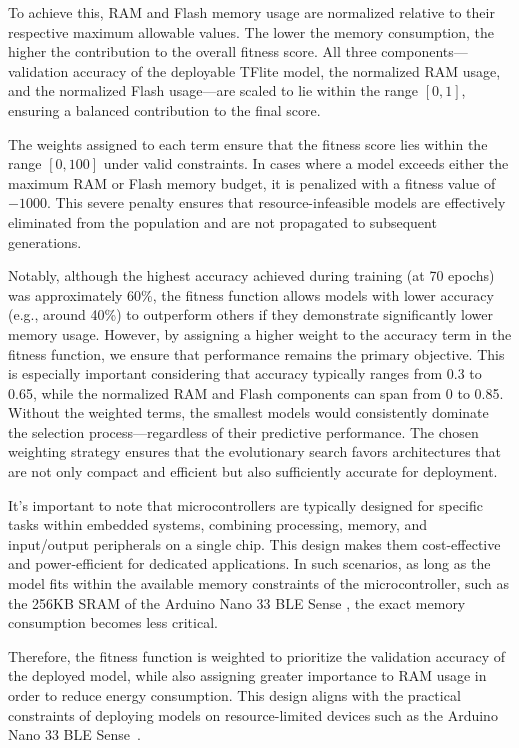 To achieve this, RAM and Flash memory usage are normalized relative to their respective maximum allowable values. The lower the memory consumption, the higher the contribution to the overall fitness score. All three components—validation accuracy of the deployable TFlite model, the normalized RAM usage, and the normalized Flash usage—are scaled to lie within the range \([0,1]\), ensuring a balanced contribution to the final score.

The weights assigned to each term ensure that the fitness score lies within the range \([0,100]\) under valid constraints. In cases where a model exceeds either the maximum RAM or Flash memory budget, it is penalized with a fitness value of \(-1000\). This severe penalty ensures that resource-infeasible models are effectively eliminated from the population and are not propagated to subsequent generations.


Notably, although the highest accuracy achieved during training (at 70 epochs) was approximately 60\%, the fitness function allows models with lower accuracy (e.g., around 40\%) to outperform others if they demonstrate significantly lower memory usage. However, by assigning a higher weight to the accuracy term in the fitness function, we ensure that performance remains the primary objective. This is especially important considering that accuracy typically ranges from 0.3 to 0.65, while the normalized RAM and Flash components can span from 0 to 0.85. Without the weighted terms, the smallest models would consistently dominate the selection process—regardless of their predictive performance. The chosen weighting strategy ensures that the evolutionary search favors architectures that are not only compact and efficient but also sufficiently accurate for deployment.

It's important to note that microcontrollers are typically designed for specific tasks within embedded systems, combining processing, memory, and input/output peripherals on a single chip. This design makes them cost-effective and power-efficient for dedicated applications. In such scenarios, as long as the model fits within the available memory constraints of the microcontroller, such as the 256KB SRAM of the Arduino Nano 33 BLE Sense , the exact memory consumption becomes less critical. 

Therefore, the fitness function is weighted to prioritize the validation accuracy of the deployed model, while also assigning greater importance to RAM usage in order to reduce energy consumption. This design aligns with the practical constraints of deploying models on resource-limited devices such as the Arduino Nano 33 BLE Sense~\cite{arduino_nano33ble}.


